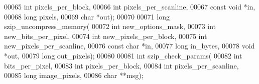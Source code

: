 \begin{DoxyCode}
00065     \textcolor{keywordtype}{int} pixels\_per\_block,
00066     \textcolor{keywordtype}{int} pixels\_per\_scanline,
00067     \textcolor{keyword}{const} \textcolor{keywordtype}{void} *in,
00068     \textcolor{keywordtype}{long} pixels,
00069     \textcolor{keywordtype}{char} *out);
00070 
00071 \textcolor{keywordtype}{long} szip\_uncompress\_memory(
00072     \textcolor{keywordtype}{int} new\_options\_mask,
00073     \textcolor{keywordtype}{int} new\_bits\_per\_pixel,
00074     \textcolor{keywordtype}{int} new\_pixels\_per\_block,
00075     \textcolor{keywordtype}{int} new\_pixels\_per\_scanline, 
00076     \textcolor{keyword}{const} \textcolor{keywordtype}{char} *in,
00077     \textcolor{keywordtype}{long} in\_bytes,
00078     \textcolor{keywordtype}{void} *out,
00079     \textcolor{keywordtype}{long} out\_pixels);
00080 
00081 \textcolor{keywordtype}{int} szip\_check\_params(
00082     \textcolor{keywordtype}{int} bits\_per\_pixel,
00083     \textcolor{keywordtype}{int} pixels\_per\_block,
00084     \textcolor{keywordtype}{int} pixels\_per\_scanline,
00085     \textcolor{keywordtype}{long} image\_pixels,
00086     \textcolor{keywordtype}{char} **msg);
\end{DoxyCode}

